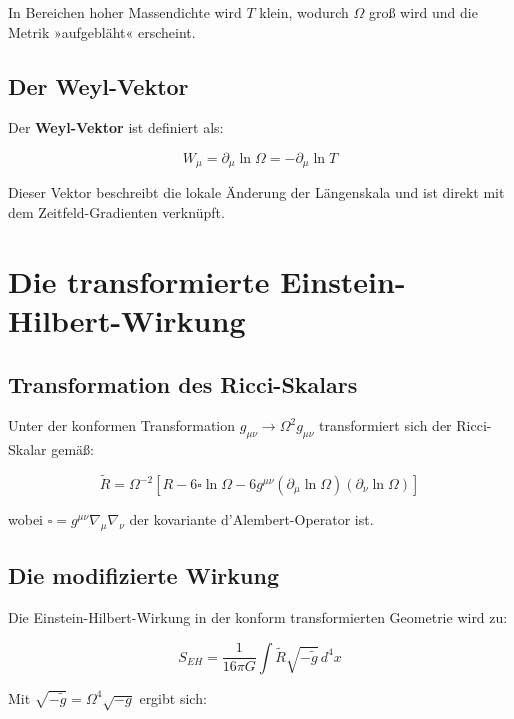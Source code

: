 \documentclass[12pt,a4paper]{report}
\begin{document}
	In Bereichen hoher Massendichte wird $T$ klein, wodurch $\Omega$ groß wird und die Metrik »aufgebläht« erscheint.
	
	\subsection{Der Weyl-Vektor}
	
	Der \textbf{Weyl-Vektor} ist definiert als:
	
	\begin{equation}
		W_\mu = \partial_\mu \ln \Omega = -\partial_\mu \ln T
	\end{equation}
	
	Dieser Vektor beschreibt die lokale Änderung der Längenskala und ist direkt mit dem Zeitfeld-Gradienten verknüpft.
	
	\section{Die transformierte Einstein-Hilbert-Wirkung}
	
	\subsection{Transformation des Ricci-Skalars}
	
	Unter der konformen Transformation $g_{\mu\nu} \to \Omega^2 g_{\mu\nu}$ transformiert sich der Ricci-Skalar gemäß:
	
	\begin{equation}
		\tilde{R} = \Omega^{-2}[R - 6\square\ln \Omega - 6g^{\mu\nu}(\partial_\mu \ln \Omega)(\partial_\nu \ln \Omega)]
	\end{equation}
	
	wobei $\square = g^{\mu\nu}\nabla_\mu\nabla_\nu$ der kovariante d'Alembert-Operator ist.
	
	\subsection{Die modifizierte Wirkung}
	
	Die Einstein-Hilbert-Wirkung in der konform transformierten Geometrie wird zu:
	
	\begin{equation}
		S_{EH} = \frac{1}{16\pi G} \int \tilde{R} \sqrt{-\tilde{g}} \, d^4x
	\end{equation}
	
	Mit $\sqrt{-\tilde{g}} = \Omega^4 \sqrt{-g}$ ergibt sich:
	
\end{document}

